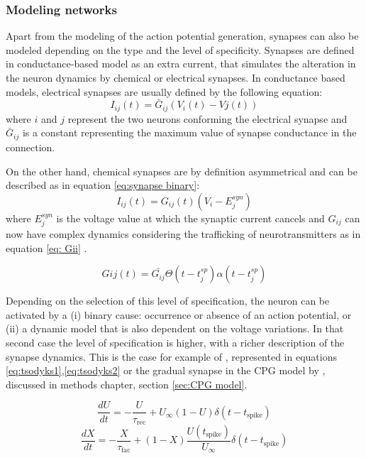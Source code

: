 \subsubsection{\large{Modeling networks}}
\label{c-intro-synapses}
Apart from the modeling of the action potential generation, synapses can also be modeled depending on the type and the level of specificity. Synapses are defined in conductance-based model as an extra current, that simulates the alteration in the neuron dynamics by chemical or electrical synapses. In conductance based models, electrical synapses are usually defined by the following equation:
\begin{equation}
    I_{ij}(t) = \bar{G}_{ij} (V_i(t) - Vj(t))
\end{equation}
\noindent where $i$ and $j$ represent the two neurons conforming the electrical synapse and $\bar{G}_{ij}$ is a constant representing the maximum value of synapse conductance in the connection.

On the other hand, chemical synapses are by definition asymmetrical and can be described as in equation \ref{eq:synapse binary}:
\begin{equation}
     I_{ij}(t) = G_{ij}(t) (V_i - E_j^{syn})
     \label{eq:synapse binary}
\end{equation}
\noindent where $E_j^{syn}$ is the voltage value at which the synaptic current cancels and $G_{ij}$ can now have complex dynamics considering the trafficking of neurotransmitters as in equation \ref{eq: Gii} \parencite{torres_modeling_2012}. 

\begin{equation}
	G{ij}(t) = \bar{G_{ij}}  \Theta(t-t_j^{sp}) \alpha (t-t_j^{sp})
	\label{eq: Gii}
\end{equation}

Depending on the selection of this level of specification, the neuron can be activated by a (i) binary cause: occurrence or absence of an action potential, or (ii) a dynamic model that is also dependent on the voltage variations. In that second case the level of specification is higher, with a richer description of the synapse dynamics. This is the case for example of \cite{tsodyks_neural_1997}, represented in equations \ref{eq:tsodyks1},\ref{eq:tsodyks2} or the gradual synapse in the CPG model by \cite{vavoulis_dynamic_2007}, discussed in methods chapter, section \ref{sec:CPG model}.


\begin{equation}
	\frac{dU}{dt} = -\frac{U}{\tau_{\text{rec}}} + U_{\infty}(1 - U) \delta(t - t_{\text{spike}})
	\label{eq:tsodyks1}
\end{equation}
\begin{equation}
	\frac{dX}{dt} = -\frac{X}{\tau_{\text{fac}}} + (1 - X) \frac{U(t_{\text{spike}})}{U_{\infty}} \delta(t - t_{\text{spike}})
	\label{eq:tsodyks2}
\end{equation}


